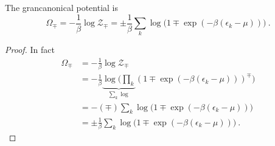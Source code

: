    The grancanonical potential is 
    \begin{equation*}
        \Omega_\mp = -\frac{1}{\beta} \log \mathcal Z_\mp = \pm \frac{1}{\beta} \sum_k \log \Big (1 \mp \exp (-\beta (\epsilon_k - \mu)) \Big) ~.
    \end{equation*}
    \begin{proof}
        In fact 
        \begin{equation*}
        \begin{aligned}
            \Omega_\mp & = -\frac{1}{\beta} \log \mathcal Z_\mp \\ & = - \frac{1}{\beta} \underbrace{\log \Big (\prod_k}_{\sum_k \log} ( 1 \mp \exp(- \beta (\epsilon_k - \mu) ))^\mp \Big ) \\ & = - (\mp) \sum_k \log \Big (1 \mp \exp (-\beta (\epsilon_k - \mu))) \\ & = \pm \frac{1}{\beta} \sum_k \log \Big (1 \mp \exp (-\beta (\epsilon_k - \mu)) \Big) ~.
        \end{aligned}
        \end{equation*}
    \end{proof}

